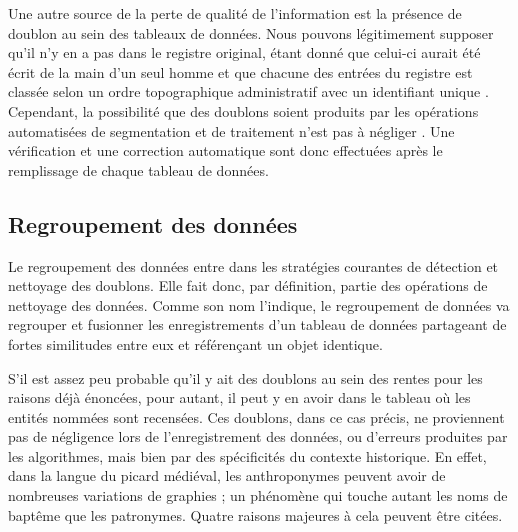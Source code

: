Une autre source de la perte de qualité de l'information est la présence de doublon au sein des tableaux de données. Nous pouvons légitimement supposer qu'il n'y en a pas dans le registre original, étant donné que celui-ci aurait été écrit de la main d'un seul homme  et que chacune des entrées du registre est classée selon un ordre topographique administratif avec un identifiant unique \parencite{espinas_les_1933}. Cependant, la possibilité que des doublons soient produits par les opérations automatisées de segmentation et de traitement n’est pas à négliger \parencite{koudoro-parfait_reconnaissance_2022}. Une vérification et une correction automatique sont donc effectuées après le remplissage de chaque tableau de données.

\subsection{Regroupement des données}
Le regroupement des données entre dans les stratégies courantes de détection et nettoyage des doublons. Elle fait donc, par définition, partie des opérations de nettoyage des données. Comme son nom l'indique, le regroupement de données va regrouper et fusionner les enregistrements d'un tableau de données  partageant de fortes similitudes entre eux et référençant un objet identique. 

S'il est assez peu probable qu'il y ait des doublons au sein des rentes pour les raisons déjà énoncées, pour autant, il peut y en avoir dans le tableau où les entités nommées sont recensées. Ces doublons, dans ce cas précis, ne proviennent pas de négligence lors de l'enregistrement des données, ou d'erreurs  produites par les algorithmes, mais bien par des spécificités du contexte historique.
En effet, dans la langue du picard médiéval, les anthroponymes peuvent avoir de nombreuses variations de graphies ; un phénomène qui touche autant les noms de baptême que les patronymes.  Quatre raisons majeures à cela peuvent être citées.

